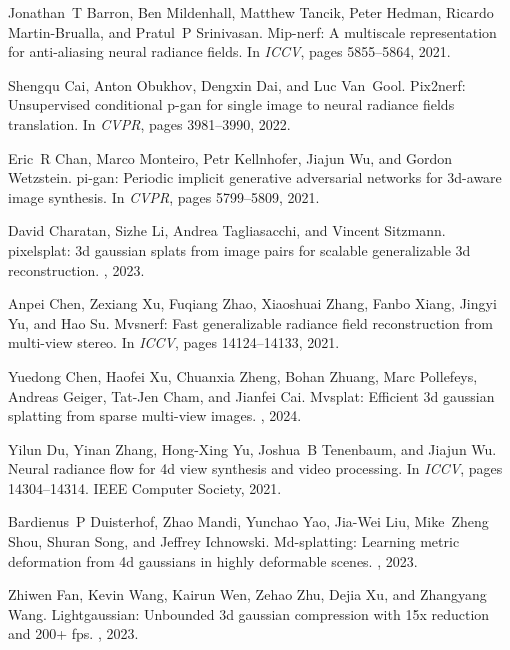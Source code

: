 \documentclass{article}
\begin{document}
{
\small
\begin{thebibliography}{10}

Jonathan~T Barron, Ben Mildenhall, Matthew Tancik, Peter Hedman, Ricardo Martin-Brualla, and Pratul~P Srinivasan.
\newblock Mip-nerf: A multiscale representation for anti-aliasing neural radiance fields.
\newblock In {\em ICCV}, pages 5855--5864, 2021.

Shengqu Cai, Anton Obukhov, Dengxin Dai, and Luc Van~Gool.
\newblock Pix2nerf: Unsupervised conditional p-gan for single image to neural radiance fields translation.
\newblock In {\em CVPR}, pages 3981--3990, 2022.

Eric~R Chan, Marco Monteiro, Petr Kellnhofer, Jiajun Wu, and Gordon Wetzstein.
\newblock pi-gan: Periodic implicit generative adversarial networks for 3d-aware image synthesis.
\newblock In {\em CVPR}, pages 5799--5809, 2021.

David Charatan, Sizhe Li, Andrea Tagliasacchi, and Vincent Sitzmann.
\newblock pixelsplat: 3d gaussian splats from image pairs for scalable generalizable 3d reconstruction.
, 2023.

Anpei Chen, Zexiang Xu, Fuqiang Zhao, Xiaoshuai Zhang, Fanbo Xiang, Jingyi Yu, and Hao Su.
\newblock Mvsnerf: Fast generalizable radiance field reconstruction from multi-view stereo.
\newblock In {\em ICCV}, pages 14124--14133, 2021.

Yuedong Chen, Haofei Xu, Chuanxia Zheng, Bohan Zhuang, Marc Pollefeys, Andreas Geiger, Tat-Jen Cham, and Jianfei Cai.
\newblock Mvsplat: Efficient 3d gaussian splatting from sparse multi-view images.
, 2024.

Yilun Du, Yinan Zhang, Hong-Xing Yu, Joshua~B Tenenbaum, and Jiajun Wu.
\newblock Neural radiance flow for 4d view synthesis and video processing.
\newblock In {\em ICCV}, pages 14304--14314. IEEE Computer Society, 2021.

Bardienus~P Duisterhof, Zhao Mandi, Yunchao Yao, Jia-Wei Liu, Mike~Zheng Shou, Shuran Song, and Jeffrey Ichnowski.
\newblock Md-splatting: Learning metric deformation from 4d gaussians in highly deformable scenes.
, 2023.

Zhiwen Fan, Kevin Wang, Kairun Wen, Zehao Zhu, Dejia Xu, and Zhangyang Wang.
\newblock Lightgaussian: Unbounded 3d gaussian compression with 15x reduction and 200+ fps.
, 2023.


\end{thebibliography}}
\end{document}
